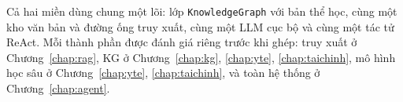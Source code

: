 Cả hai miền dùng chung một lõi: lớp \texttt{KnowledgeGraph} với bản thể học, cùng một kho văn bản và đường ống
truy xuất, cùng một LLM cục bộ và cùng một tác tử ReAct. Mỗi thành phần được đánh giá riêng trước khi ghép:
truy xuất ở Chương~\ref{chap:rag}, KG ở Chương~\ref{chap:kg}, \ref{chap:yte}, \ref{chap:taichinh}, mô hình học
sâu ở Chương~\ref{chap:yte}, \ref{chap:taichinh}, và toàn hệ thống ở Chương~\ref{chap:agent}.
